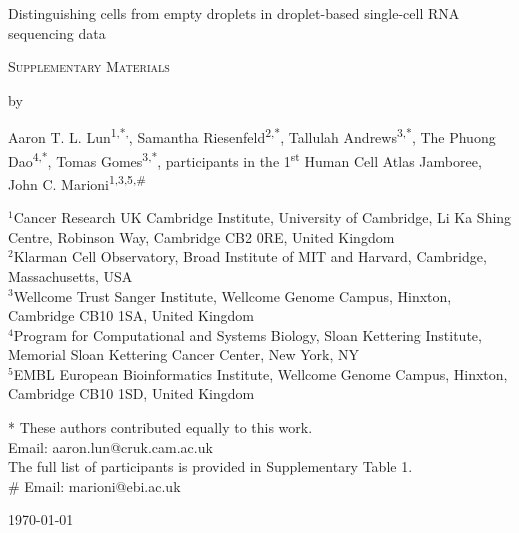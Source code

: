 \documentclass{article}
\begin{document}
\begin{titlepage}
\vspace*{3cm}
\begin{center}


{\LARGE
Distinguishing cells from empty droplets in droplet-based single-cell RNA sequencing data
\par}

\vspace{0.75cm}

{\Large
    \textsc{Supplementary Materials}
\par
}
\vspace{0.75cm}

\large
by


\vspace{0.75cm}
\begin{minipage}{0.9\textwidth}
\begin{flushleft}
Aaron T. L. Lun\textsuperscript{1,*,\dag{}},
Samantha Riesenfeld\textsuperscript{2,*},
Tallulah Andrews\textsuperscript{3,*},
The Phuong Dao\textsuperscript{4,*},
Tomas Gomes\textsuperscript{3,*},
participants in the 1\textsuperscript{st} Human Cell Atlas Jamboree\textsuperscript{\ddag},
John C. Marioni\textsuperscript{1,3,5,\#}
\end{flushleft}
\end{minipage}

\vspace{1cm}
\begin{minipage}{0.9\textwidth}
\begin{flushleft}
$^1$Cancer Research UK Cambridge Institute, University of Cambridge, Li Ka Shing Centre, Robinson Way, Cambridge CB2 0RE, United Kingdom \\[6pt]
$^2$Klarman Cell Observatory, Broad Institute of MIT and Harvard, Cambridge, Massachusetts, USA \\[6pt]
$^3$Wellcome Trust Sanger Institute, Wellcome Genome Campus, Hinxton, Cambridge CB10 1SA, United Kingdom \\[6pt]
$^4$Program for Computational and Systems Biology, Sloan Kettering Institute, Memorial Sloan Kettering Cancer Center, New York, NY \\[6pt]
$^5$EMBL European Bioinformatics Institute, Wellcome Genome Campus, Hinxton, Cambridge CB10 1SD, United Kingdom
\end{flushleft}
* These authors contributed equally to this work. \\
\dag{} Email: aaron.lun@cruk.cam.ac.uk \\
\ddag{} The full list of participants is provided in Supplementary Table 1. \\
\# Email: marioni@ebi.ac.uk
\end{minipage}

\vspace{1.5cm}
{\large \today{}}

\vspace*{\fill}
\end{center}
\end{titlepage}
\end{document}
